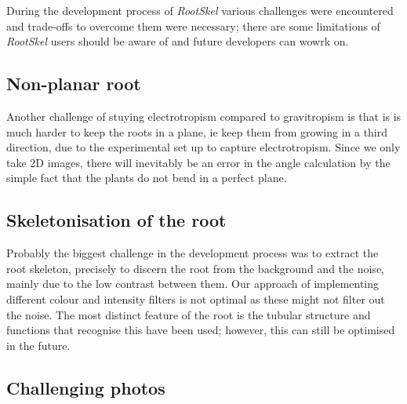 During the development process of \textit{RootSkel} various challenges were encountered and trade-offs to overcome them were necessary; there are some limitations of \textit{RootSkel} users should be aware of and future developers can wowrk on.


\subsection{Non-planar root}

Another challenge of stuying electrotropism compared to gravitropism is that is is much harder to keep the roots in a plane, ie keep them from growing in a third direction, due to the experimental set up to capture electrotropism. Since we only take 2D images, there will inevitably be an error in the angle calculation by the simple fact that the plants do not bend in a perfect plane.


\subsection{Skeletonisation of the root}

Probably the biggest challenge in the development process was to extract the root skeleton, precisely to discern the root from the background and the noise, mainly due to the low contrast between them.
Our approach of implementing different colour and intensity filters is not optimal as these might not filter out the noise. 
The most distinct feature of the root is the tubular structure and functions that recognise this have been used; however, this can still be optimised in the future.



\subsection{Challenging photos}

